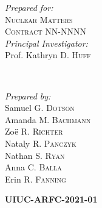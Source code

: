 \begin{titlepage}
       \begin{minipage}{0.45\textwidth}
               \begin{flushleft}
                       \large
                       \textit{Prepared for:}\\
                       \textsc{Nuclear Matters}\\ %
                       \textsc{Contract} NN-NNNN
                       \vspace{4mm}\\ %
                       \textit{Principal Investigator:}\\ %
                       Prof. Kathryn D. \textsc{Huff} %
                \end{flushleft}
       \end{minipage}
       ~
       \begin{minipage}{0.45\textwidth}
               \begin{flushright}
                       \large
                       \textit{Prepared by:}\\
                       Samuel G. \textsc{Dotson}\\ %
                       Amanda M. \textsc{Bachmann}\\ %
                       Zo\"{e} R. \textsc{Richter}\\ %
                       Nataly R. \textsc{Panczyk}\\ %
                       Nathan S. \textsc{Ryan}\\ %
                       Anna C. \textsc{Balla}\\ %
                       Erin R. \textsc{Fanning}
               \end{flushright}
    \end{minipage}
    

    \vspace{.5cm}
    \textsc{\LARGE\bfseries UIUC-ARFC-2021-01} %
    \vspace{0.2cm}
    

\end{titlepage}
